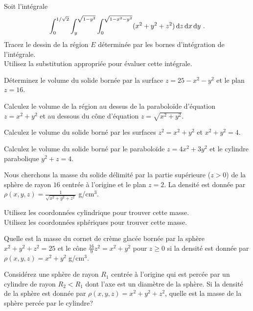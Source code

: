 \begin{question}
Soit l'intégrale
\[
\int_0^{1/\sqrt{2}} \int_y^{\sqrt{1-y^2}}
\int_0^{\sqrt{1-x^2-y^2}} (x^2+y^2+z^2) \,\mathrm{d}z\,\mathrm{d}x\,\mathrm{d}y \ .
\]
 Tracez le dessin de la région $E$ déterminée par les bornes
d'intégration de l'intégrale.\\
 Utilisez la substitution appropriée pour évaluer cette
intégrale.
\label{16Q23}
\end{question}

\begin{question}
Déterminez le volume du solide bornée par la surface
$z = 25 - x^2-y^2$ et le plan $z=16$. 
\label{16Q24}
\end{question}

\begin{question}
Calculez le volume de la région au dessus de la paraboloïde d'équation
$z = x^2 + y^2$ et au dessous du cône d'équation $z = \sqrt{x^2+y^2}$.
\label{16Q25}
\end{question}

\begin{question}
Calculez le volume du solide borné par les surfaces $z^2 = x^2 + y^2$
et $x^2+y^2 = 4$.
\label{16Q26}
\end{question}

\begin{question}
Calculez le volume du solide borné par le paraboloïde
$z = 4x^2 + 3y^2$ et le cylindre parabolique $y^2 + z = 4$.
\label{16Q27}
\end{question}

\begin{question}
Nous cherchons la masse du solide délimité par la partie supérieure ($z>0$)
de la sphère de rayon $16$ centrée à l'origine et le plan $z=2$.
La densité est donnée par
$\displaystyle \rho(x,y,z) = \frac{1}{\sqrt{x^2+y^2+z^2}}$ g/cm$^3$.

 Utilisez les coordonnées cylindrique pour trouver cette
masse.\\
 Utilisez les coordonnées sphériques pour trouver cette
masse.
\label{16Q28}
\end{question}

\begin{question}
Quelle est la masse du cornet de crème glacée bornée par la sphère
$x^2+y^2+z^2 =25$ et le cône $\displaystyle \frac{16}{9} z^2 = x^2 + y^2$ pour
$z\geq 0$ si la densité est donnée par $\rho(x,y,z) = x^2+y^2$ g/cm$^3$.
\label{16Q29}
\end{question}

\begin{question}
Considérez une sphère de rayon $R_1$ centrée à l'origine qui est
percée par un cylindre de rayon $R_2 < R_1$ dont l'axe est un diamètre
de la sphère.  Si la densité de la sphère est donnée par
$\rho(x,y,z) = x^2+y^2+z^2$, quelle est la masse de
la sphère percée par le cylindre?
\label{16Q30}
\end{question}



